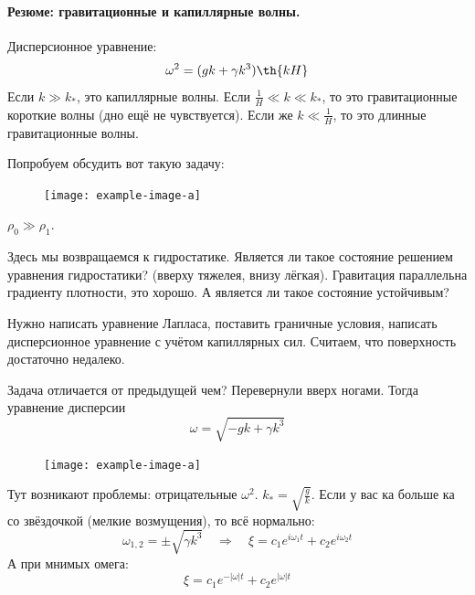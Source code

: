 \paragraph{Резюме: гравитационные и капиллярные волны.}
Дисперсионное уравнение:
\begin{equation}
    \omega^2 = (gk+\gamma k^3)\th{kH}
\end{equation}
Если $k \gg k_*$, это капиллярные волны. 
Если $\frac{1}{H} \ll k \ll k_*$, то это гравитационные короткие волны (дно ещё не чувствуется).
Если же $k \ll \frac{1}{H}$, то это длинные гравитационные волны.

Попробуем обсудить вот такую задачу:

\begin{figure}[H]
    \centering
    \texttt{[image: example-image-a]}
    \caption{}
    \label{fig:figure1}
\end{figure}
$\rho_0 \gg \rho_1$.

Здесь мы возвращаемся к гидростатике.
Является ли такое состояние решением уравнения гидростатики? (вверху тяжелея, внизу лёгкая).
Гравитация параллельна градиенту плотности, это хорошо. 
А является ли такое состояние устойчивым? 

Нужно написать уравнение Лапласа, поставить граничные условия, написать дисперсионное уравнение с учётом капиллярных сил. 
Считаем, что поверхность достаточно недалеко.

Задача отличается от предыдущей чем?
Перевернули вверх ногами.
Тогда уравнение дисперсии
\begin{equation}
    \omega = \sqrt{-gk+\gamma k^3}
\end{equation}

\begin{figure}[H]
    \centering
    \texttt{[image: example-image-a]}
    \caption{}
    \label{fig:figure1}
\end{figure}

Тут возникают проблемы: отрицательные $\omega^2$. $k_* = \sqrt{\frac{g}{k}}$. Если у вас ка больше ка со звёздочкой (мелкие возмущения), то всё нормально:
\begin{equation}
    \omega_{1,2} = \pm\sqrt{\gamma k^3}
    \quad \Rightarrow \quad
    \xi = c_1e^{i\omega_1 t}+c_2e^{i\omega_2 t}
\end{equation}
А при мнимых омега:
\begin{equation}
    \xi = c_1e^{-|\omega|t}+c_2e^{|\omega|t}
\end{equation}


